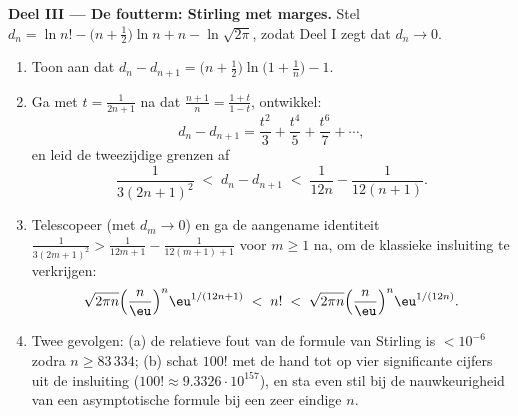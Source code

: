 \begin{problem}
\medskip
\noindent\textbf{Deel III --- De foutterm: Stirling met marges.}
Stel $d_n = \ln n! - \bigl(n + \tfrac12\bigr)\ln n + n -
\ln\sqrt{2\pi}$, zodat Deel I zegt dat $d_n \to 0$.
\begin{enumerate}[resume]
  \item Toon aan dat $d_n - d_{n+1} = \bigl(n +
        \tfrac12\bigr)\ln\bigl(1 + \tfrac1n\bigr) - 1$.
  \item Ga met $t = \frac1{2n+1}$ na dat $\frac{n+1}n =
        \frac{1+t}{1-t}$, ontwikkel:
        \[
        d_n - d_{n+1} = \frac{t^2}3 + \frac{t^4}5 +
        \frac{t^6}7 + \cdots,
        \]
        en leid de tweezijdige grenzen af
        \[
        \frac1{3(2n+1)^2} \;<\; d_n - d_{n+1} \;<\;
        \frac1{12n} - \frac1{12(n+1)} .
        \]
  \item Telescopeer (met $d_m \to 0$) en ga de aangename
         identiteit $\frac1{3(2m+1)^2} >
        \frac1{12m+1} - \frac1{12(m+1)+1}$ voor $m \geq 1$ na, om
        de klassieke insluiting te verkrijgen:
        \[
        \sqrt{2\pi n}\Bigl(\frac n\eu\Bigr)^n
        \eu^{1/(12n+1)} \;<\; n! \;<\;
        \sqrt{2\pi n}\Bigl(\frac n\eu\Bigr)^n\eu^{1/(12n)} .
        \]
  \item Twee gevolgen: (a) de relatieve fout van de formule van
        Stirling is $< 10^{-6}$ zodra $n \geq 83\,334$; (b) schat
        $100!$ met de hand tot op vier significante cijfers uit de
        insluiting ($100! \approx 9.3326\cdot 10^{157}$), en sta
        even stil bij de nauwkeurigheid van een asymptotische
        formule bij een zeer eindige $n$.
\end{enumerate}


\end{problem}
